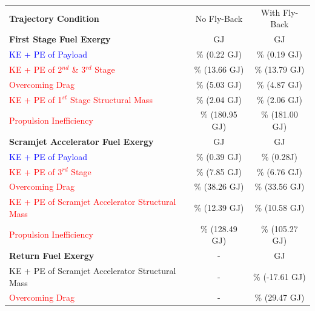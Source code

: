 \begin{table}[ht]%
	\centering
	\begin{tabular}{l c c} 
		\hline \textbf{Trajectory Condition}
		& No Fly-Back
		& With Fly-Back
		\\
		\textbf{First Stage Fuel Exergy} 
		&\textbf{\firstEnergyStandardNoReturn} GJ
		&\textbf{\firstEnergyStandard} GJ
		\\
		
		\textcolor{blue}{KE + PE of Payload}
		& \firstWpayloadStandardNoReturn \% (0.22 GJ)
		& \firstWpayloadStandard \% (0.19 GJ)
		\\
		\textcolor{red}{KE + PE of  2$^{nd}$ \& 3$^{rd}$ Stage}
		& \firstWnextStageStandardNoReturn \% (13.66 GJ)  & \firstWnextStageStandard \% (13.79 GJ)
		\\
		\textcolor{red}{Overcoming Drag} 
		& \WDoneStandardNoReturn \% (5.03 GJ) & \WDoneStandard \% (4.87 GJ)
		\\
		\textcolor{red}{KE + PE of 1$^{st}$ Stage Structural Mass} 
		& \WoneStandardNoReturn \% (2.04 GJ) & \WoneStandard \% (2.06 GJ)
		\\
		
		
		\textcolor{red}{Propulsion Inefficiency} 
		& \PlossoneCombinedStandardNoReturn \% (180.95 GJ) & \PlossoneCombinedStandard \% (181.00 GJ)
		\\ 
		\textbf{Scramjet Accelerator Fuel Exergy} 
		& \textbf{\secondEnergyStandardNoReturn} GJ & \textbf{\secondEnergyStandard} GJ
		\\
		\textcolor{blue}{KE + PE of Payload}
		& \secondWpayloadStandardNoReturn \% (0.39 GJ) & \secondWpayloadStandard \% (0.28J)
		\\
		\textcolor{red}{KE + PE of 3$^{rd}$ Stage}
		& \secondWnextStageStandardNoReturn \% (7.85 GJ) & \secondWnextStageStandard \% (6.76 GJ)
		\\
		\textcolor{red}{Overcoming Drag}
		& \WDsecondStandardNoReturn \% (38.26 GJ) & \WDsecondStandard \% (33.56 GJ)
		\\
		\textcolor{red}{KE + PE of Scramjet Accelerator Structural Mass}  
		& \WsecondStandardNoReturn \% (12.39 GJ) & \WsecondStandard \% (10.58 GJ)
		\\
		\textcolor{red}{Propulsion Inefficiency}  
		& \PlosssecondCombinedStandardNoReturn \% (128.49 GJ) & \PlosssecondCombinedStandard \% (105.27 GJ)
		\\
		
		
		
		\textbf{Return Fuel Exergy} 
		& - & \textbf{\returnEnergyStandard} GJ
		\\
		KE + PE of Scramjet Accelerator Structural Mass
		& - & \WreturnStandard \% (-17.61 GJ)
		\\
		\textcolor{red}{Overcoming Drag}
		& - & \WDreturnStandard \% (29.47 GJ)
		\\
		

\end{tabular}
\end{table}
